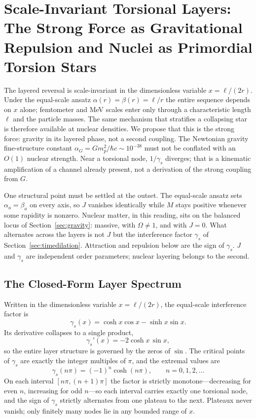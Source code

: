 \documentclass[a4paper]{article}
\begin{document}
\section{Scale-Invariant Torsional Layers: The Strong Force as Gravitational Repulsion and Nuclei as Primordial Torsion Stars}
\label{sec:nuclear}

The layered reversal is scale-invariant in the dimensionless variable \(x=\ell/(2r)\). Under the equal-scale ansatz \(\alpha(r)=\beta(r)=\ell/r\) the entire sequence depends on \(x\) alone; femtometer and MeV scales enter only through a characteristic length \(\ell\) and the particle masses. The same mechanism that stratifies a collapsing star is therefore available at nuclear densities. We propose that this is the strong force: gravity in its layered phase, not a second coupling. The Newtonian gravity fine-structure constant \(\alpha_G=G m_p^2/\hbar c\sim 10^{-38}\) must not be conflated with an \(O(1)\) nuclear strength. Near a torsional node, \(1/\gamma_s\) diverges; that is a kinematic amplification of a channel already present, not a derivation of the strong coupling from \(G\).

One structural point must be settled at the outset. The equal-scale ansatz sets \(\alpha_a=\beta_a\) on every axis, so \(J\) vanishes identically while \(M\) stays positive whenever some rapidity is nonzero. Nuclear matter, in this reading, sits on the balanced locus of Section~\ref{sec:gravity}: massive, with \(\Omega\neq 1\), and with \(J=0\). What alternates across the layers is not \(J\) but the interference factor \(\gamma_s\) of Section~\ref{sec:timedilation}. Attraction and repulsion below are the sign of \(\gamma_s\). \(J\) and \(\gamma_s\) are independent order parameters; nuclear layering belongs to the second.

\subsection{The Closed-Form Layer Spectrum}
\label{subsec:layer-spectrum}

Written in the dimensionless variable \(x=\ell/(2r)\), the equal-scale interference factor is
\[
\gamma_s(x)=\cosh x\cos x-\sinh x\sin x .
\]
Its derivative collapses to a single product,
\begin{equation}
\label{eq:gammaS-derivative}
\gamma_s'(x)=-2\cosh x\,\sin x ,
\end{equation}
so the entire layer structure is governed by the zeros of \(\sin\). The critical points of \(\gamma_s\) are exactly the integer multiples of \(\pi\), and the extremal values are
\[
\gamma_s(n\pi)=(-1)^n\cosh(n\pi),\qquad n=0,1,2,\dots
\]
On each interval \([n\pi,(n+1)\pi]\) the factor is strictly monotone---decreasing for even \(n\), increasing for odd \(n\)---so each interval carries exactly one torsional node, and the sign of \(\gamma_s\) strictly alternates from one plateau to the next. Plateaux never vanish; only finitely many nodes lie in any bounded range of \(x\).
\end{document}

